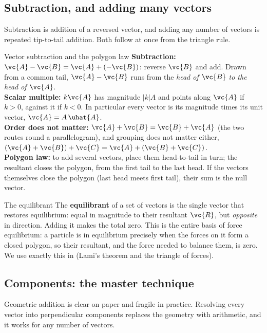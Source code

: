 \subsection{Subtraction, and adding many vectors}

Subtraction is addition of a reversed vector, and adding any number of vectors is repeated tip-to-tail
addition. Both follow at once from the triangle rule.

\begin{keybox}{Vector subtraction and the polygon law}
\textbf{Subtraction:} $\vc{A}-\vc{B}=\vc{A}+(-\vc{B})$: reverse $\vc{B}$ and add. Drawn from a common tail, $\vc{A}-\vc{B}$ runs from
the \emph{head of $\vc{B}$ to the head of $\vc{A}$}. \\[3pt]
\textbf{Scalar multiple:} $k\vc{A}$ has magnitude $|k|A$ and points along $\vc{A}$ if $k>0$, against it
if $k<0$. In particular every vector is its magnitude times its unit vector, $\vc{A}=A\,\uhat{A}$. \\[3pt]
\textbf{Order does not matter:} $\vc{A}+\vc{B}=\vc{B}+\vc{A}$ (the two routes round a parallelogram), and
grouping does not matter either, $(\vc{A}+\vc{B})+\vc{C}=\vc{A}+(\vc{B}+\vc{C})$. \\[3pt]
\textbf{Polygon law:} to add several vectors, place them head-to-tail in turn; the resultant closes the
polygon, from the first tail to the last head. If the vectors themselves close the polygon (last head
meets first tail), their sum is the null vector.
\end{keybox}

\begin{defbox}{The equilibrant}
The \textbf{equilibrant} of a set of vectors is the single vector that restores equilibrium: equal in
magnitude to their resultant $\vc{R}$, but \emph{opposite} in direction. Adding it makes the total zero.
This is the entire basis of force equilibrium: a particle is in equilibrium precisely when the forces on
it form a closed polygon, so their resultant, and the force needed to balance them, is zero. We
use exactly this in  (Lami's theorem and the triangle of forces).
\end{defbox}

\subsection{Components: the master technique}

Geometric addition is clear on paper and fragile in practice. Resolving every vector into perpendicular
components replaces the geometry with arithmetic, and it works for any number of vectors.

